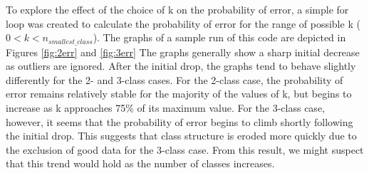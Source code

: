 To explore the effect of the choice of k on the probability of error, a simple 
for loop was created to calculate the probability of error for the range 
of possible k ($0 < k < n_{smallest\_class}$). The graphs of a sample run of
this code are depicted in Figures \ref{fig:2err} and \ref{fig:3err} The graphs
generally show a sharp initial decrease as outliers are ignored. 
After the initial drop, the graphs tend to behave slightly differently for the
2- and 3-class cases.  For the 2-class case, the probability of error remains
relatively stable for the majority of the values of k, but begins to increase
as k approaches 75\% of its maximum value. For the 3-class case, however, it
seems that the probability of error begins to climb shortly following the
initial drop.  This suggests that class structure is eroded more quickly due to the exclusion of good data for the 3-class case.  From this result, we might suspect that this trend would
hold as the number of classes increases.